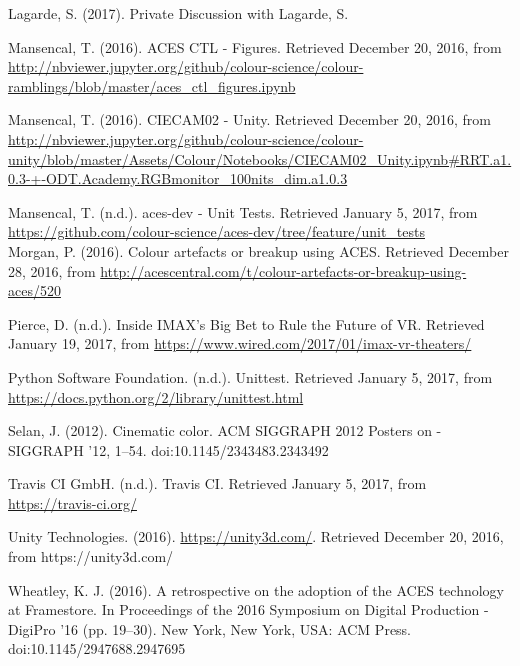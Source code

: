 \documentclass[conference]{IEEEtran}
\begin{document}
\begin{thebibliography}{1}
\renewcommand\@biblabel[1]{[Lag17}
\bibitem{}
Lagarde, S. (2017). Private Discussion with Lagarde, S. \vspace{2mm}

\renewcommand\@biblabel[1]{[MaA16]}
\bibitem{}
Mansencal, T. (2016). ACES CTL - Figures. Retrieved December 20, 2016, from \url{http://nbviewer.jupyter.org/github/colour-science/colour-ramblings/blob/master/aces_ctl_figures.ipynb} \vspace{2mm}

\renewcommand\@biblabel[1]{[MaB16]}
\bibitem{}
Mansencal, T. (2016). CIECAM02 - Unity. Retrieved December 20, 2016, from \url{http://nbviewer.jupyter.org/github/colour-science/colour-unity/blob/master/Assets/Colour/Notebooks/CIECAM02_Unity.ipynb#RRT.a1.0.3-+-ODT.Academy.RGBmonitor_100nits_dim.a1.0.3} \vspace{2mm}

\renewcommand\@biblabel[1]{[Man17]}
\bibitem{}
Mansencal, T. (n.d.). aces-dev - Unit Tests. Retrieved January 5, 2017, from \url{https://github.com/colour-science/aces-dev/tree/feature/unit_tests}\\

\renewcommand\@biblabel[1]{[Mor16]}
\bibitem{}
Morgan, P. (2016). Colour artefacts or breakup using ACES. Retrieved December 28, 2016, from \url{http://acescentral.com/t/colour-artefacts-or-breakup-using-aces/520} \vspace{2mm}

\renewcommand\@biblabel[1]{[Pie20]}
\bibitem{}
Pierce, D. (n.d.). Inside IMAX’s Big Bet to Rule the Future of VR. Retrieved January 19, 2017, from \url{https://www.wired.com/2017/01/imax-vr-theaters/} \vspace{2mm}

\renewcommand\@biblabel[1]{[Pyt17]}
\bibitem{}
Python Software Foundation. (n.d.). Unittest. Retrieved January 5, 2017, from \url{https://docs.python.org/2/library/unittest.html} \vspace{2mm}

\renewcommand\@biblabel[1]{[Sel12]}
\bibitem{}
Selan, J. (2012). Cinematic color. ACM SIGGRAPH 2012 Posters on - SIGGRAPH ’12, 1–54. doi:10.1145/2343483.2343492 \vspace{2mm}

\renewcommand\@biblabel[1]{[Trav17]}
\bibitem{}
Travis CI GmbH. (n.d.). Travis CI. Retrieved January 5, 2017, from \url{https://travis-ci.org/} \vspace{2mm}

\renewcommand\@biblabel[1]{[Uni16]}
\bibitem{}
Unity Technologies. (2016). \url{https://unity3d.com/}. Retrieved December 20, 2016, from {https://unity3d.com/} \vspace{2mm}

\renewcommand\@biblabel[1]{[Whe16]}
\bibitem{}
Wheatley, K. J. (2016). A retrospective on the adoption of the ACES technology at Framestore. In Proceedings of the 2016 Symposium on Digital Production - DigiPro ’16 (pp. 19–30). New York, New York, USA: ACM Press. doi:10.1145/2947688.2947695 \vspace{2mm}
	 
\end{thebibliography}
\end{document}
